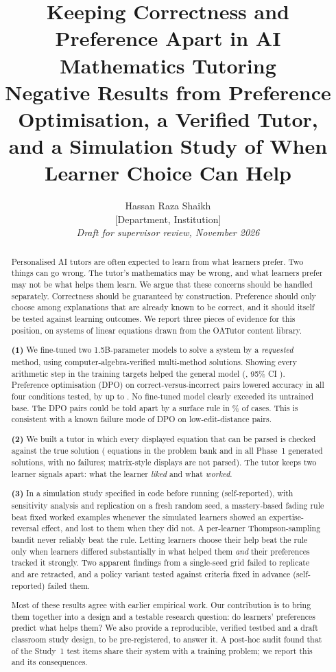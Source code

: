 \documentclass[11pt,a4paper]{article}
\title{\textbf{Keeping Correctness and Preference Apart in AI Mathematics Tutoring}\\[4pt]
\large Negative Results from Preference Optimisation, a Verified Tutor,\\ and a Simulation Study of When Learner Choice Can Help}
\author{Hassan Raza Shaikh\\[2pt]\small [Department, Institution]\\[2pt]\small\textit{Draft for supervisor review, November 2026}}
\date{}
\begin{document}
\maketitle

\begin{abstract}
\noindent Personalised AI tutors are often expected to learn from what learners prefer. Two
things can go wrong. The tutor's mathematics may be wrong, and what learners prefer may not
be what helps them learn. We argue that these concerns should be handled separately.
Correctness should be guaranteed by construction. Preference should only choose among
explanations that are already known to be correct, and it should itself be tested against
learning outcomes. We report three pieces of evidence for this position, on systems of
linear equations drawn from the OATutor content library.

\textbf{(1)} We fine-tuned two 1.5B-parameter models to solve a system by a \emph{requested}
method, using computer-algebra-verified multi-method solutions. Showing every arithmetic
step in the training targets helped the general model (\numFormatDiffGen{}, 95\% CI
\numFormatCIGen{}). Preference optimisation (DPO) on correct-versus-incorrect pairs lowered
accuracy in all four conditions tested, by up to \numDpoWorkedDiffMath{}. No fine-tuned
model clearly exceeded its untrained base. The DPO pairs could be told apart by a
surface rule in \numSurfaceRuleWorked\% of cases. This is consistent with a known failure
mode of DPO on low-edit-distance pairs.

\textbf{(2)} We built a tutor in which every displayed equation that can be parsed is checked
against the true solution (\numBankStepChecked{} equations in the problem bank and
\numPhaseOneStepChecked{} in all Phase~1 generated solutions, with no failures; matrix-style
displays are not parsed). The tutor keeps two learner signals
apart: what the learner \emph{liked} and what \emph{worked}.

\textbf{(3)} In a simulation study specified in code before running (self-reported), with sensitivity
analysis and replication on a fresh random seed, a mastery-based fading rule beat fixed
worked examples whenever the simulated learners showed an expertise-reversal effect, and
lost to them when they did not. A per-learner Thompson-sampling bandit never reliably beat the rule.
Letting learners choose their help beat the rule only when learners differed substantially
in what helped them \emph{and} their preferences tracked it strongly. Two apparent findings
from a single-seed grid failed to replicate and are retracted, and a policy variant tested
against criteria fixed in advance (self-reported) failed them.

Most of these results agree with earlier empirical work. Our contribution is to bring them
together into a design and a testable research question: do learners' preferences predict
what helps them? We also provide a reproducible, verified testbed and a draft classroom
study design, to be pre-registered, to answer it. A post-hoc audit found that
\numLeakTestItems{} of the \numTestItems{} Study~1 test items share their system with a
training problem; we report this and its consequences.
\end{abstract}
\end{document}
